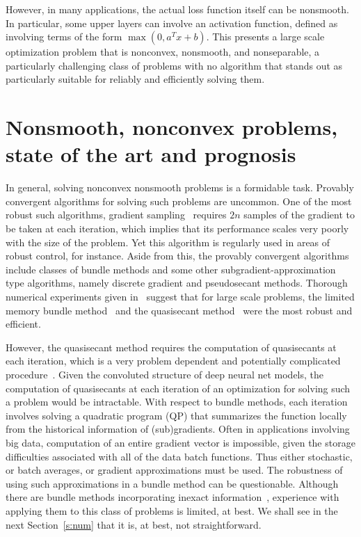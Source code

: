 \documentclass[psamsfonts,onesided,10pt]{amsart}
\theoremstyle{definition}
\theoremstyle{remark}
\numberwithin{equation}{section}
\begin{document}
However, in many applications, the actual loss function itself can be nonsmooth. In particular, some upper layers
can involve an activation function, defined as involving terms of the form $\max(0,a^T x+b)$. This presents
a large scale optimization problem that is nonconvex, nonsmooth, and nonseparable, a particularly challenging
class of problems with no algorithm that stands out as particularly suitable for reliably and efficiently 
solving them. 

\section{Nonsmooth, nonconvex problems, state of the art and prognosis}
In general, solving nonconvex nonsmooth problems is a formidable task. Provably convergent algorithms for solving such
problems are uncommon. One of the most robust such algorithms, gradient sampling~\cite{burke2005robust} requires $2n$ samples of 
the gradient to be taken at each iteration, which implies that its performance scales very poorly with the size of the problem. 
Yet this algorithm is regularly used in areas of robust control, for instance. Aside from this, the provably convergent
algorithms include classes of bundle methods and some other subgradient-approximation type algorithms, namely discrete gradient
and pseudosecant methods. Thorough numerical experiments given in~\cite{bagirov2014introduction} suggest that for large
scale problems, the limited memory bundle method~\cite{haarala2004new} and the quasisecant method~\cite{bagirov2013subgradient}
were the most robust and efficient. 

However, the quasisecant method requires the computation of quasisecants at each iteration, which is a very problem
dependent and potentially complicated procedure~\cite{bagirov2010quasisecant}. Given the convoluted structure
of deep neural net models, the computation of quasisecants at each iteration of an optimization for solving
such a problem would be intractable. With respect to bundle methods, each iteration involves solving a quadratic program (QP)
that summarizes the function locally from the historical information of (sub)gradients. Often in applications
involving big data, computation of an entire gradient vector is impossible, given the storage difficulties associated
with all of the data batch functions. Thus either stochastic, or batch averages, or gradient approximations must be
used. The robustness of using such approximations in a bundle method can be questionable. Although there are 
bundle methods incorporating inexact information~\cite{de2014convex}, experience with applying them to this class
of problems is limited, at best. We shall see in the next Section~\ref{s:num} that it is, at best, not straightforward.
\end{document}
